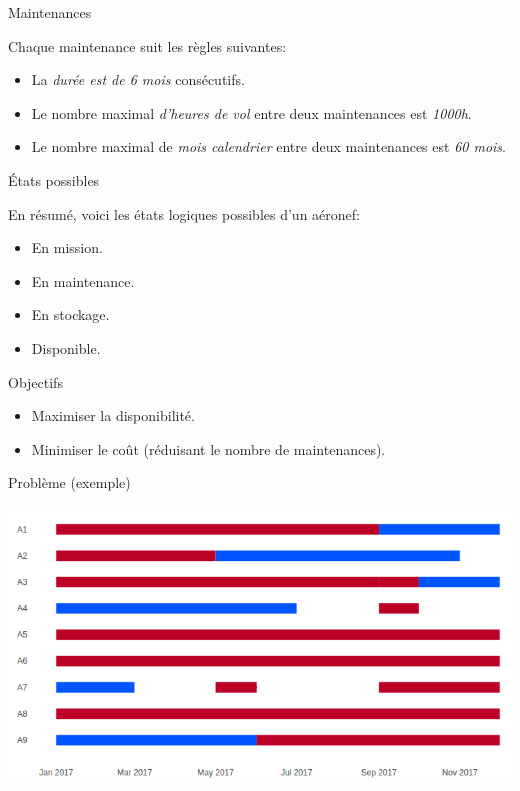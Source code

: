 \documentclass[ignorenonframetext,]{beamer}
\providecommand{\tightlist}{%
  \setlength{\itemsep}{0pt}\setlength{\parskip}{0pt}}
\begin{document}
\begin{frame}{Maintenances}

Chaque maintenance suit les règles suivantes:

\begin{itemize}[<+->]
\tightlist
\item
  La \emph{durée est de 6 mois} consécutifs.
\item
  Le nombre maximal \emph{d'heures de vol} entre deux maintenances est
  \emph{1000h}.
\item
  Le nombre maximal de \emph{mois calendrier} entre deux maintenances
  est \emph{60 mois}.
\end{itemize}

\end{frame}

\begin{frame}{États possibles}

En résumé, voici les états logiques possibles d'un aéronef:

\begin{itemize}[<+->]
\tightlist
\item
  En mission.
\item
  En maintenance.
\item
  En stockage.
\item
  Disponible.
\end{itemize}

\end{frame}

\begin{frame}{Objectifs}

\begin{itemize}[<+->]
\tightlist
\item
  Maximiser la disponibilité.
\item
  Minimiser le coût (réduisant le nombre de maintenances).
\end{itemize}

\end{frame}

\begin{frame}{Problème (exemple)}

\includegraphics[width=1\linewidth]{./../../img/calendar}

\end{frame}
\end{document}
